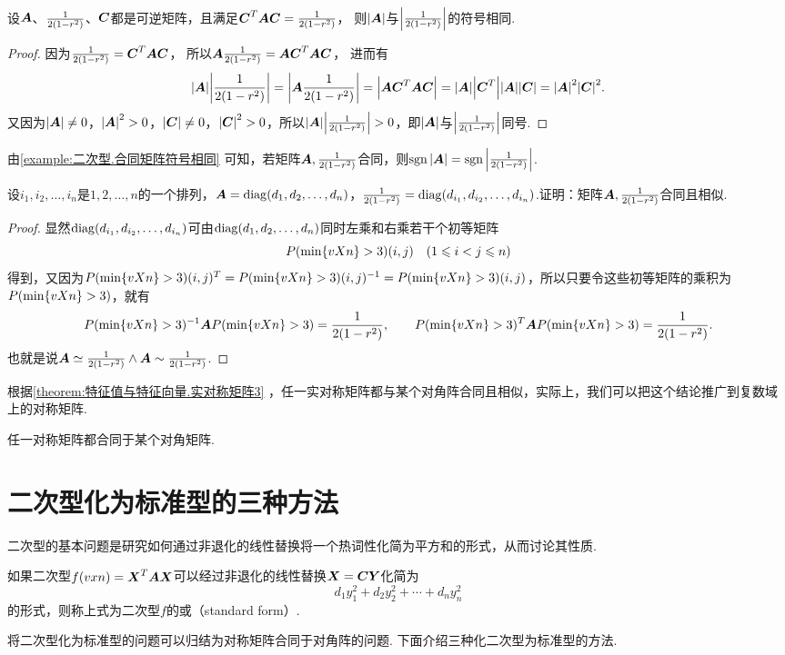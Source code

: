 \begin{example}\label{example:二次型.合同矩阵符号相同}
设\(\A\)、\(\B\)、\(\C\)都是可逆矩阵，且满足\(\C^T\A\C=\B\)，%
则\(\abs{\A}\)与\(\abs{\B}\)的符号相同.
\begin{proof}
因为\(\B=\C^T\A\C\)，%
所以\(\A\B=\A\C^T\A\C\)，%
进而有\[
\abs{\A}\abs{\B}
=\abs{\A\B}
=\abs{\A\C^T\A\C}
=\abs{\A}\abs{\C^T}\abs{\A}\abs{\C}
=\abs{\A}^2\abs{\C}^2.
\]
又因为\(\abs{\A} \neq 0\)，\(\abs{\A}^2 > 0\)，\(\abs{\C} \neq 0\)，\(\abs{\C}^2 > 0\)，所以\(\abs{\A}\abs{\B} > 0\)，即\(\abs{\A}\)与\(\abs{\B}\)同号.
\end{proof}
\end{example}
由\cref{example:二次型.合同矩阵符号相同} 可知，若矩阵\(\A,\B\)合同，则\(\sgn\abs{\A}=\sgn\abs{\B}\).

\begin{example}
设\(i_1,i_2,\dotsc,i_n\)是\(1,2,\dotsc,n\)的一个排列，\(\A=\diag(d_1,d_2,\dotsc,d_n)\)，\(\B=\diag(d_{i_1},d_{i_2},\dotsc,d_{i_n})\).证明：矩阵\(\A,\B\)合同且相似.
\begin{proof}
显然\(\diag(d_{i_1},d_{i_2},\dotsc,d_{i_n})\)可由\(\diag(d_1,d_2,\dotsc,d_n)\)同时左乘和右乘若干个初等矩阵\[
\P(i,j) \quad(1 \leqslant i < j \leqslant n)
\]得到，又因为\(\P(i,j)^T = \P(i,j)^{-1} = \P(i,j)\)，所以只要令这些初等矩阵的乘积为\(\P\)，就有\[
\P^{-1} \A \P = \B,
\qquad
\P^T \A \P = \B.
\]也就是说\(\A\simeq\B\land\A\sim\B\).
\end{proof}
\end{example}

根据\cref{theorem:特征值与特征向量.实对称矩阵3} ，任一实对称矩阵都与某个对角阵合同且相似，实际上，我们可以把这个结论推广到复数域上的对称矩阵.
\begin{theorem}
任一对称矩阵都合同于某个对角矩阵.
\end{theorem}

\section{二次型化为标准型的三种方法}
二次型的基本问题是研究如何通过非退化的线性替换将一个热词性化简为平方和的形式，从而讨论其性质.
\begin{definition}
如果二次型\(f(\v{x}{n})=\x^T\A\x\)可以经过非退化的线性替换\(\x=\C\mat{Y}\)化简为\[
d_1 y_1^2 + d_2 y_2^2 + \dotsb + d_n y_n^2
\]的形式，则称上式为二次型\(f\)的或（standard form）.
\end{definition}
将二次型化为标准型的问题可以归结为对称矩阵合同于对角阵的问题.
下面介绍三种化二次型为标准型的方法.

